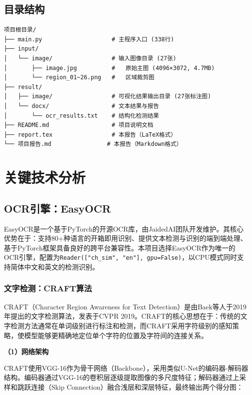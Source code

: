 \documentclass[12pt,hyperref,a4paper,UTF8]{ctexart}
\begin{document}
\subsection{目录结构}

\begin{verbatim}
项目根目录/
├── main.py                    # 主程序入口 (338行)
├── input/
│   └── image/                 # 输入图像目录 (27张)
│       ├── image.jpg          #   原始主图 (4096×3072, 4.7MB)
│       └── region_01~26.png   #   区域裁剪图
├── result/
│   ├── image/                 # 可视化结果输出目录 (27张标注图)
│   └── docx/                  # 文本结果与报告
│       └── ocr_results.txt    # 结构化检测结果
├── README.md                  # 项目说明文档
├── report.tex                 # 本报告（LaTeX格式）
└── 项目报告.md                # 本报告（Markdown格式）
\end{verbatim}

\clearpage

\section{关键技术分析}

\subsection{OCR引擎：EasyOCR}

EasyOCR是一个基于PyTorch的开源OCR库，由JaidedAI团队开发维护。其核心优势在于：支持80+种语言的开箱即用识别、提供文本检测与识别的端到端处理、基于PyTorch框架具备良好的跨平台兼容性。本项目选择EasyOCR作为唯一的OCR引擎，配置为\texttt{Reader(["ch\_sim", "en"], gpu=False)}，以CPU模式同时支持简体中文和英文的检测识别。

\subsubsection{文字检测：CRAFT算法}

CRAFT（Character Region Awareness for Text Detection）是由Baek等人于2019年提出的文字检测算法，发表于CVPR 2019。CRAFT的核心思想在于：传统的文字检测方法通常在单词级别进行标注和检测，而CRAFT采用字符级别的感知策略，使模型能够更精确地定位单个字符的位置及字符间的连接关系。

\textbf{（1）网络架构}

CRAFT使用VGG-16作为骨干网络（Backbone），采用类似U-Net的编码器-解码器结构。编码器通过VGG-16的卷积层逐级提取图像的多尺度特征；解码器通过上采样和跳跃连接（Skip Connection）融合浅层和深层特征，最终输出两个得分图：
\end{document}
